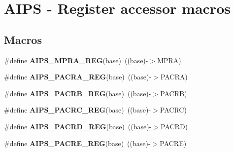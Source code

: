 \hypertarget{group__AIPS__Register__Accessor__Macros}{}\section{A\+I\+PS -\/ Register accessor macros}
\label{group__AIPS__Register__Accessor__Macros}
\subsection*{Macros}
\begin{DoxyCompactItemize}
\item 
\#define {\bfseries A\+I\+P\+S\+\_\+\+M\+P\+R\+A\+\_\+\+R\+EG}(base)~((base)-\/$>$M\+P\+RA)\hypertarget{group__AIPS__Register__Accessor__Macros_ga4e4aa0c63e320336e387dc2a6b4ce170}{}\label{group__AIPS__Register__Accessor__Macros_ga4e4aa0c63e320336e387dc2a6b4ce170}

\item 
\#define {\bfseries A\+I\+P\+S\+\_\+\+P\+A\+C\+R\+A\+\_\+\+R\+EG}(base)~((base)-\/$>$P\+A\+C\+RA)\hypertarget{group__AIPS__Register__Accessor__Macros_ga945c95b631033cdc33d21130d4ea67aa}{}\label{group__AIPS__Register__Accessor__Macros_ga945c95b631033cdc33d21130d4ea67aa}

\item 
\#define {\bfseries A\+I\+P\+S\+\_\+\+P\+A\+C\+R\+B\+\_\+\+R\+EG}(base)~((base)-\/$>$P\+A\+C\+RB)\hypertarget{group__AIPS__Register__Accessor__Macros_ga1720a4b720037f4104c5c37b45c5453e}{}\label{group__AIPS__Register__Accessor__Macros_ga1720a4b720037f4104c5c37b45c5453e}

\item 
\#define {\bfseries A\+I\+P\+S\+\_\+\+P\+A\+C\+R\+C\+\_\+\+R\+EG}(base)~((base)-\/$>$P\+A\+C\+RC)\hypertarget{group__AIPS__Register__Accessor__Macros_ga13216283c51b00abc6d40b5d36dc3f4f}{}\label{group__AIPS__Register__Accessor__Macros_ga13216283c51b00abc6d40b5d36dc3f4f}

\item 
\#define {\bfseries A\+I\+P\+S\+\_\+\+P\+A\+C\+R\+D\+\_\+\+R\+EG}(base)~((base)-\/$>$P\+A\+C\+RD)\hypertarget{group__AIPS__Register__Accessor__Macros_ga6be7b5735fca3749544107bdf9ed4b92}{}\label{group__AIPS__Register__Accessor__Macros_ga6be7b5735fca3749544107bdf9ed4b92}

\item 
\#define {\bfseries A\+I\+P\+S\+\_\+\+P\+A\+C\+R\+E\+\_\+\+R\+EG}(base)~((base)-\/$>$P\+A\+C\+RE)\hypertarget{group__AIPS__Register__Accessor__Macros_gab562e6b0465ab1ad1784861bea380827}{}\label{group__AIPS__Register__Accessor__Macros_gab562e6b0465ab1ad1784861bea380827}


\end{DoxyCompactItemize}
